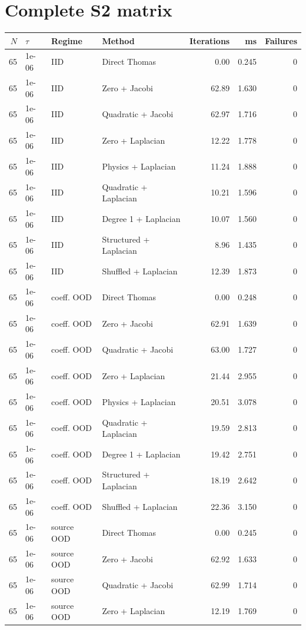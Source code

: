 \section{Complete S2 matrix}
\small
\begin{longtable}{rlllrrr}
\toprule
$N$ & $\tau$ & Regime & Method & Iterations & ms & Failures \\
\midrule\endhead
65 & 1e-06 & IID & Direct Thomas & 0.00 & 0.245 & 0 \\
65 & 1e-06 & IID & Zero + Jacobi & 62.89 & 1.630 & 0 \\
65 & 1e-06 & IID & Quadratic + Jacobi & 62.97 & 1.716 & 0 \\
65 & 1e-06 & IID & Zero + Laplacian & 12.22 & 1.778 & 0 \\
65 & 1e-06 & IID & Physics + Laplacian & 11.24 & 1.888 & 0 \\
65 & 1e-06 & IID & Quadratic + Laplacian & 10.21 & 1.596 & 0 \\
65 & 1e-06 & IID & Degree 1 + Laplacian & 10.07 & 1.560 & 0 \\
65 & 1e-06 & IID & Structured + Laplacian & 8.96 & 1.435 & 0 \\
65 & 1e-06 & IID & Shuffled + Laplacian & 12.39 & 1.873 & 0 \\
65 & 1e-06 & coeff. OOD & Direct Thomas & 0.00 & 0.248 & 0 \\
65 & 1e-06 & coeff. OOD & Zero + Jacobi & 62.91 & 1.639 & 0 \\
65 & 1e-06 & coeff. OOD & Quadratic + Jacobi & 63.00 & 1.727 & 0 \\
65 & 1e-06 & coeff. OOD & Zero + Laplacian & 21.44 & 2.955 & 0 \\
65 & 1e-06 & coeff. OOD & Physics + Laplacian & 20.51 & 3.078 & 0 \\
65 & 1e-06 & coeff. OOD & Quadratic + Laplacian & 19.59 & 2.813 & 0 \\
65 & 1e-06 & coeff. OOD & Degree 1 + Laplacian & 19.42 & 2.751 & 0 \\
65 & 1e-06 & coeff. OOD & Structured + Laplacian & 18.19 & 2.642 & 0 \\
65 & 1e-06 & coeff. OOD & Shuffled + Laplacian & 22.36 & 3.150 & 0 \\
65 & 1e-06 & source OOD & Direct Thomas & 0.00 & 0.245 & 0 \\
65 & 1e-06 & source OOD & Zero + Jacobi & 62.92 & 1.633 & 0 \\
65 & 1e-06 & source OOD & Quadratic + Jacobi & 62.99 & 1.714 & 0 \\
65 & 1e-06 & source OOD & Zero + Laplacian & 12.19 & 1.769 & 0 \\

\end{longtable}
